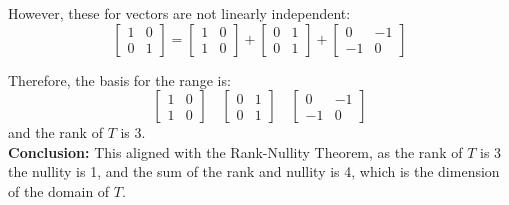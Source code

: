 However, these for vectors are not linearly independent: \\
\[
    \begin{bmatrix}
        1 & 0 \\
        0 & 1
    \end{bmatrix}
    =
    \begin{bmatrix}
        1 & 0 \\
        1 & 0
    \end{bmatrix}
    +
    \begin{bmatrix}
        0 & 1 \\
        0 & 1
    \end{bmatrix}
    +
    \begin{bmatrix}
        0 & -1 \\
        -1 & 0
    \end{bmatrix}
\]

Therefore, the basis for the range is:
\[
    \begin{bmatrix}
        1 & 0 \\
        1 & 0
    \end{bmatrix}
    \quad
    \begin{bmatrix}
        0 & 1 \\
        0 & 1
    \end{bmatrix}
    \quad
    \begin{bmatrix}
        0 & -1 \\
        -1 & 0
    \end{bmatrix}
\]
and the rank of $T$ is 3.\\
\textbf{Conclusion:}
This aligned with the Rank-Nullity Theorem, as the rank of $T$ is 3 the nullity is 1, and the sum of the rank and nullity is 4, which is the dimension of the domain of $T$.